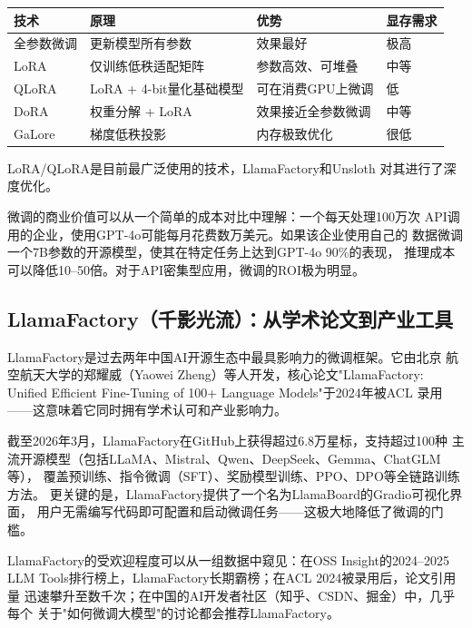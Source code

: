 \begin{keybox}[主流微调技术路线对比]
\small
\begin{tabularx}{\textwidth}{l X X l}
\toprule
\rowcolor{figLightGray}
\textbf{技术} & \textbf{原理} & \textbf{优势} & \textbf{显存需求} \\
\midrule
全参数微调  & 更新模型所有参数           & 效果最好           & 极高 \\
LoRA       & 仅训练低秩适配矩阵         & 参数高效、可堆叠   & 中等 \\
QLoRA      & LoRA + 4-bit量化基础模型   & 可在消费GPU上微调  & 低 \\
DoRA       & 权重分解 + LoRA            & 效果接近全参数微调  & 中等 \\
GaLore     & 梯度低秩投影               & 内存极致优化        & 很低 \\
\bottomrule
\end{tabularx}

\medskip
\noindent LoRA/QLoRA是目前最广泛使用的技术，LlamaFactory和Unsloth
对其进行了深度优化。
\end{keybox}

微调的商业价值可以从一个简单的成本对比中理解：一个每天处理100万次
API调用的企业，使用GPT-4o可能每月花费数万美元。如果该企业使用自己的
数据微调一个7B参数的开源模型，使其在特定任务上达到GPT-4o 90\%的表现，
推理成本可以降低10--50倍。对于API密集型应用，微调的ROI极为明显。

\subsection{LlamaFactory（千影光流）：从学术论文到产业工具}
\label{subsec:ch04-llamafactory}

LlamaFactory是过去两年中国AI开源生态中最具影响力的微调框架。它由北京
航空航天大学的郑耀威（Yaowei Zheng）等人开发，核心论文"LlamaFactory:
Unified Efficient Fine-Tuning of 100+ Language Models"于2024年被ACL
录用——这意味着它同时拥有学术认可和产业影响力。

截至2026年3月，LlamaFactory在GitHub上获得超过6.8万星标，支持超过100种
主流开源模型（包括LLaMA、Mistral、Qwen、DeepSeek、Gemma、ChatGLM等），
覆盖预训练、指令微调（SFT）、奖励模型训练、PPO、DPO等全链路训练方法。
更关键的是，LlamaFactory提供了一个名为LlamaBoard的Gradio可视化界面，
用户无需编写代码即可配置和启动微调任务——这极大地降低了微调的门槛。

LlamaFactory的受欢迎程度可以从一组数据中窥见：在OSS Insight的2024--2025
LLM Tools排行榜上，LlamaFactory长期霸榜；在ACL 2024被录用后，论文引用量
迅速攀升至数千次；在中国的AI开发者社区（知乎、CSDN、掘金）中，几乎每个
关于"如何微调大模型"的讨论都会推荐LlamaFactory。

